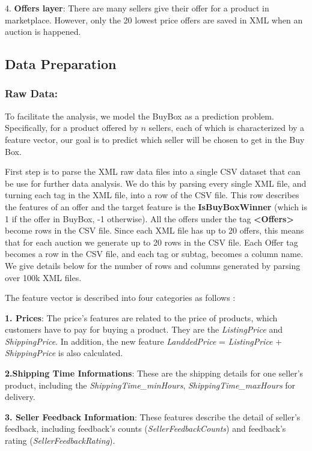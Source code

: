 4. \textbf{Offers layer}: There are many  sellers give their offer for a product in marketplace. However, only the 20 lowest price offers are saved in XML when an auction is happened.

\subsection{Data Preparation}
\label{sec:dataprepare}

\subsubsection{Raw Data:}
\label{sec:datacsv}
To facilitate the analysis, we model the BuyBox as a prediction problem. Specifically, for a product offered by $n$ sellers, each of which is characterized by a feature vector, our goal is to predict which seller will be chosen to get in the Buy Box. 

First step is to parse the XML raw data files into a single CSV dataset that can be use for further data analysis. We do this by parsing every single XML file, and turning each tag in the XML file, into a row of the CSV file. This row describes the features of an offer and the target feature is the \textbf{IsBuyBoxWinner} (which is 1 if the offer in BuyBox, -1 otherwise). All the offers under the tag \textbf{<Offers>} become rows in the CSV file. Since each XML file has up to 20 offers, this means that for each auction we generate up to 20 rows in the CSV file. Each Offer tag becomes a row in the CSV file, and each tag or subtag, becomes a column name. We give details below for the number of rows and columns generated by parsing over 100k XML files.

The feature vector is described into four categories as follows :

\textbf{1. Prices}: The price's features are related to the price of products, which customers have to pay for buying a product. They are the \textit{ListingPrice} and \textit{ShippingPrice}. In addition, the new feature \textit{LanddedPrice} = \textit{ListingPrice} + \textit{ShippingPrice} is also calculated.

\textbf{2.Shipping Time Informations}: These are the shipping details for one seller's product, including the \textit{ShippingTime\_minHours}, \textit{ShippingTime\_maxHours} for delivery. 

\textbf{3. Seller Feedback Information}: These features describe the detail of seller's feedback, including feedback's counts (\textit{SellerFeedbackCounts}) and feedback's rating (\textit{SellerFeedbackRating}). 

